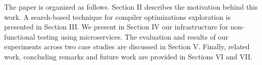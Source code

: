 \cleardoublepage


 

The paper is organized as follows.
Section II describes the motivation behind this work. A search-based technique for compiler optimizations exploration is presented in Section III. 
We present in Section IV our infrastructure for non-functional testing using microservices. 
The evaluation and results of our experiments across two case studies are discussed in Section V. 
Finally, related work, concluding remarks and future work are provided in Sections VI and VII.



